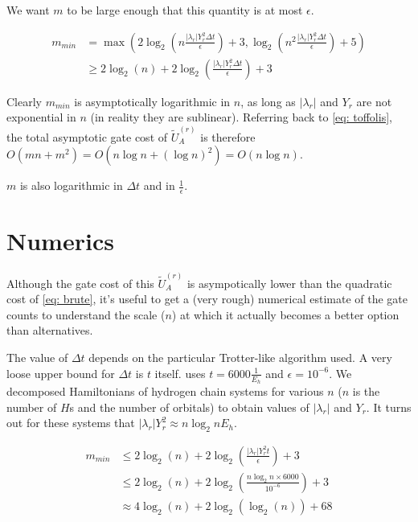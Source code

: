 We want $m$ to be large enough that this quantity is at most $\epsilon$.

\begin{equation}
    \begin{split}
        m_{min} &= \max(2\log_2\left(n\frac{|\lambda_r|Y_r^2\Delta t}{\epsilon}\right) + 3, \log_2\left(n^2\frac{|\lambda_r|Y_r^2\Delta t}{\epsilon}\right) + 5) \\
        &\geq 2\log_2(n) + 2\log_2\left(\frac{|\lambda_r|Y_r^2\Delta t}{\epsilon}\right) + 3
    \end{split}
\end{equation}

Clearly $m_{min}$ is asymptotically logarithmic in $n$, as long as $|\lambda_r|$ and $Y_r$ are not exponential in $n$ (in reality they are sublinear). Referring back to \eqref{eq: toffolis}, the total asymptotic gate cost of $\tilde{U}_A^{(r)}$ is therefore $O(mn + m^2) = O(n\log{n} + (\log{n})^2) = O(n\log{n})$.

$m$ is also logarithmic in $\Delta t$ and in $\frac{1}{\epsilon}$.

\section{Numerics}

Although the gate cost of this $\tilde{U}_A^{(r)}$ is asympotically lower than the quadratic cost of \eqref{eq: brute}, it's useful to get a (very rough) numerical estimate of the gate counts to understand the scale ($n$) at which it actually becomes a better option than alternatives.

The value of $\Delta t$ depends on the particular Trotter-like algorithm used. A very loose upper bound for $\Delta t$ is $t$ itself. \cite{Gate_Count} uses $t = 6000 \frac{1}{E_h}$ and $\epsilon = 10^{-6}$. We decomposed Hamiltonians of hydrogen chain systems for various $n$ ($n$ is the number of $H$s and the number of orbitals) to obtain values of $|\lambda_r|$ and $Y_r$. It turns out for these systems that $|\lambda_r|Y_r^2 \approx n\log_2{n} E_h$.

\begin{equation}
    \begin{split}
        m_{min} &\leq 2\log_2(n) + 2\log_2\left(\frac{|\lambda_r|Y_r^2 t}{\epsilon}\right) + 3 \\
        &\leq 2\log_2(n) + 2\log_2\left(\frac{n\log_2{n}\times 6000}{10^{-6}}\right) + 3 \\
        &\approx 4\log_2(n) + 2\log_2(\log_2(n)) + 68
    \end{split}
\end{equation}

